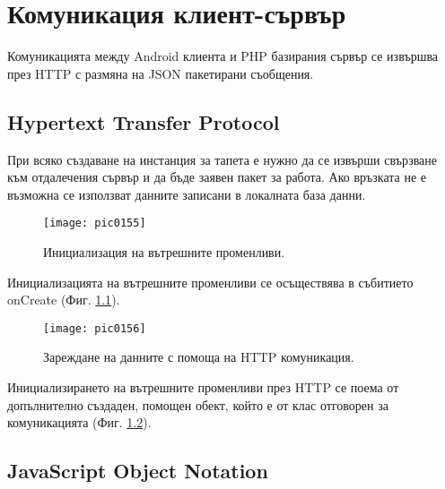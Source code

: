 \newpage
\chapter{Комуникация клиент-сървър}
\label{chapter06}

Комуникацията между Android клиента и PHP базирания сървър се извършва през HTTP с размяна на JSON пакетирани съобщения. 

\section{Hypertext Transfer Protocol}

При всяко създаване на инстанция за тапета е нужно да се извърши свързване към отдалечения сървър и да бъде заявен пакет за работа. Ако връзката не е възможна се използват данните записани в локалната база данни. 

\begin{figure}[h]
  \centering
  \texttt{[image: pic0155]}
  \caption{Инициализация на вътрешните променливи.}
\label{fig:pic0155}
\end{figure}
\FloatBarrier

Инициализацията на вътрешните променливи се осъществява в събитието onCreate (Фиг. \ref{fig:pic0155}).

\begin{figure}[h]
  \centering
  \texttt{[image: pic0156]}
  \caption{Зареждане на данните с помоща на HTTP комуникация.}
\label{fig:pic0156}
\end{figure}
\FloatBarrier

Инициализирането на вътрешните променливи през HTTP се поема от допълнително създаден, помощен обект, който е от клас отговорен за комуникацията (Фиг. \ref{fig:pic0156}). 

\section{JavaScript Object Notation}
